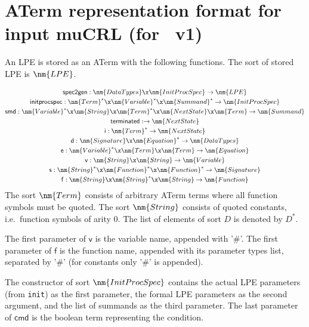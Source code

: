 \documentclass[twoside,fleqn,a4paper,dvips]{article}
\newcommand{\afunc}[3]{\mathsf{#1}:#2\rightarrow#3}
\begin{document}
\newpage
\section{ATerm representation format for input muCRL (for \mcrl\ v1)}
An LPE is stored as an ATerm with the following functions. The sort
of stored LPE is $\nm{LPE}$.

\begin{gather*}
\afunc{spec2gen}{\nm{DataTypes}\x\nm{InitProcSpec}}{\nm{LPE}}\\
\afunc{initprocspec}{\nm{Term}^*\x\nm{Variable}^*\x\nm{Summand}^*}{\nm{InitProcSpec}}\\
\afunc{smd}{\nm{Variable}^*\x\nm{String}\x\nm{Term}^*\x\nm{NextState}\x\nm{Term}}{\nm{Summand}}\\
\afunc{terminated}{}{\nm{NextState}}\\
\afunc{i}{\nm{Term}^*}{\nm{NextState}}\\
\afunc{d}{\nm{Signature}\x\nm{Equation}^*}{\nm{DataTypes}}\\
\afunc{e}{\nm{Variable}^*\x\nm{Term}\x\nm{Term}}{\nm{Equation}}\\
\afunc{v}{\nm{String}\x\nm{String}}{\nm{Variable}}\\
\afunc{s}{\nm{String}^*\x\nm{Function}^*\x\nm{Function}^*}{\nm{Signature}}\\
\afunc{f}{\nm{String}\x\nm{String}^{*}\x\nm{String}}{\nm{Function}}
\end{gather*}
The sort $\nm{Term}$ consists of arbitrary ATerm terms where all function
symbols must be quoted. The sort $\nm{String}$ consists of quoted constants,
i.e.\ function symbols of arity 0. The list
of elements of sort $D$ is denoted by $D^{*}$.

The first parameter of $\mathsf{v}$ is the variable name, appended with '\#'.
The first parameter of $\mathsf{f}$ is the function name, appended 
with its parameter types list, separated by '\#' (for constants only '\#' is appended).

The constructor of sort $\nm{InitProcSpec}$ contains the actual LPE
parameters (from \texttt{init}) as the first parameter, the formal LPE
parameters as the second argument, and the list of summands as the
third parameter. The last parameter of $\mathsf{cmd}$ is the boolean term
representing the condition.

%
%
\end{document}
